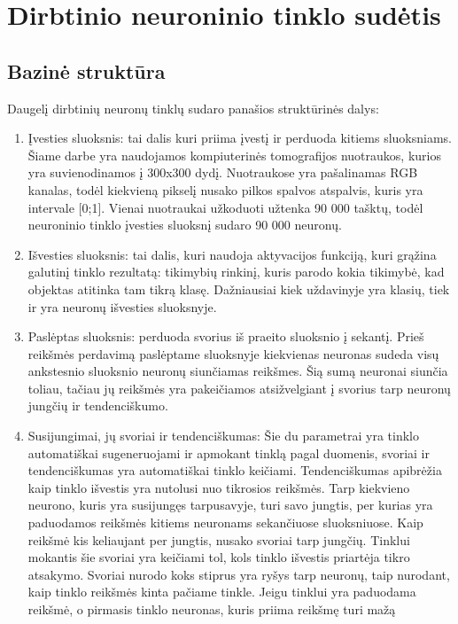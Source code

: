 \documentclass{VUMIFInfKursinis}
\begin{document}
\tableofcontents

\section{Dirbtinio neuroninio tinklo sudėtis}
\subsection{Bazinė struktūra}
Daugelį dirbtinių neuronų tinklų sudaro panašios struktūrinės dalys:
\begin{enumerate}
  \item Įvesties sluoksnis: tai dalis kuri priima įvestį ir perduoda kitiems sluoksniams.
  Šiame darbe yra naudojamos kompiuterinės tomografijos nuotraukos, kurios yra suvienodinamos
  į 300x300 dydį. Nuotraukose yra pašalinamas RGB kanalas, todėl kiekvieną pikselį nusako
  pilkos spalvos atspalvis, kuris yra intervale [0;1]. Vienai nuotraukai užkoduoti
  užtenka 90 000 tašktų, todėl neuroninio tinklo įvesties sluoksnį sudaro 90 000 neuronų.
  \item Išvesties sluoksnis: tai dalis, kuri naudoja aktyvacijos funkciją, kuri grąžina galutinį tinklo rezultatą: tikimybių rinkinį,
  kuris parodo kokia tikimybė, kad objektas atitinka tam tikrą klasę. Dažniausiai kiek
  uždavinyje yra klasių, tiek ir yra neuronų išvesties sluoksnyje.
  \item Paslėptas sluoksnis: perduoda svorius iš praeito sluoksnio į sekantį. Prieš reikšmės perdavimą paslėptame
  sluoksnyje kiekvienas neuronas sudeda visų ankstesnio sluoksnio neuronų siunčiamas reikšmes. Šią sumą
  neuronai siunčia toliau, tačiau jų reikšmės yra pakeičiamos atsižvelgiant į svorius tarp neuronų jungčių ir
  tendenciškumo.
  \item Susijungimai, jų svoriai ir tendenciškumas: Šie du parametrai yra
  tinklo automatiškai sugeneruojami ir apmokant tinklą pagal
  duomenis, svoriai ir tendenciškumas
  yra automatiškai tinklo keičiami. Tendenciškumas apibrėžia kaip tinklo išvestis yra nutolusi
  nuo tikrosios reikšmės. Tarp
  kiekvieno neurono, kuris yra susijungęs tarpusavyje, turi savo jungtis, per
  kurias yra paduodamos reikšmės kitiems neuronams sekančiuose sluoksniuose.
  Kaip reikšmė kis keliaujant per jungtis, nusako svoriai tarp jungčių. Tinklui mokantis
  šie svoriai yra keičiami tol, kols tinklo išvestis priartėja tikro atsakymo. Svoriai
  nurodo koks stiprus yra ryšys tarp neuronų, taip nurodant, kaip tinklo reikšmės kinta pačiame tinkle.
  Jeigu tinklui yra paduodama reikšmė, o pirmasis tinklo neuronas, kuris priima reikšmę turi mažą

\end{enumerate}
\end{document}

